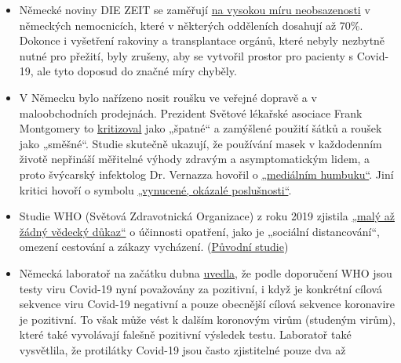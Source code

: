 \begin{itemize}
{  studie}, podle nichž by znečištění ovzduší mohlo být „klíčovým
  faktorem`` úmrtí s Covid-19. Například 80\% úmrtí ve čtyřech zemích
  bylo v nejvíce znečištěných regionech (jako je Lombardie nebo Madrid).
\item
  Německé noviny DIE ZEIT se zaměřují
  \href{https://www.zeit.de/2020/18/kliniken-coronavirus-intensivbetten-patienten-behandlung-notaufnahme}{na
  vysokou míru neobsazenosti} v německých nemocnicích, které v některých
  odděleních dosahují až 70\%. Dokonce i vyšetření rakoviny a
  transplantace orgánů, které nebyly nezbytně nutné pro přežití, byly
  zrušeny, aby se vytvořil prostor pro pacienty s Covid-19, ale tyto
  doposud do značné míry chyběly.
\item
  V Německu bylo nařízeno nosit roušku ve veřejné dopravě a v
  maloobchodních prodejnách. Prezident Světové lékařské asociace Frank
  Montgomery to
  \href{https://www.aerztezeitung.de/Politik/Montgomery-haelt-Maskenpflicht-fuer-falsch-408844.html}{kritizoval}
  jako „špatné`` a zamýšlené použití šátků a roušek jako „směšné``.
  Studie skutečně ukazují, že používání masek v každodenním životě
  nepřináší měřitelné výhody zdravým a asymptomatickým lidem, a proto
  švýcarský infektolog Dr. Vernazza hovořil o
  \href{https://infekt.ch/2020/04/atemschutzmasken-fuer-alle-medienhype-oder-unverzichtbar/}{„mediálním
  humbuku``}. Jiní kritici hovoří o symbolu
  \href{https://multipolar-magazin.de/artikel/maskenpflicht-gesellschaftliches-klima}{„vynucené,
  okázalé poslušnosti``}.
\item
  Studie WHO (Světová Zdravotnická Organizace) z roku 2019 zjistila
  \href{https://www.heise.de/tp/features/COVID-19-WHO-Studie-findet-kaum-Belege-fuer-die-Wirksamkeit-von-Eindaemmungsmassnahmen-4706446.html}{„malý
  až žádný vědecký důkaz``} o účinnosti opatření, jako je „sociální
  distancování``, omezení cestování a zákazy vycházení.
  (\href{https://www.who.int/influenza/publications/public_health_measures/publication/en/}{Původní
  studie})
\item
  Německá laboratoř na začátku dubna
  \href{http://www.labor-augsburg-mvz.de/de/aktuelles/coronavirus}{uvedla},
  že podle doporučení WHO jsou testy viru Covid-19 nyní považovány za
  pozitivní, i když je konkrétní cílová sekvence viru Covid-19 negativní
  a pouze obecnější cílová sekvence koronavire je pozitivní. To však
  může vést k dalším koronovým virům (studeným virům), které také
  vyvolávají falešně pozitivní výsledek testu. Laboratoř také
  vysvětlila, že protilátky Covid-19 jsou často zjistitelné pouze dva až

\end{itemize}
